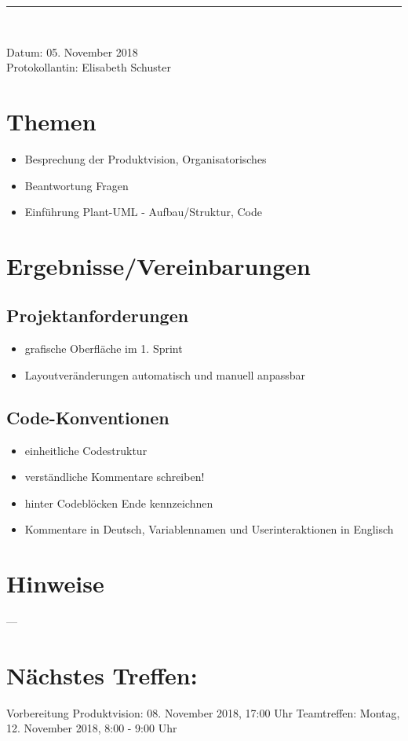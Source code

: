 \begin{center}  
\vspace{0.5pt}\nointerlineskip\rule{\textwidth}{0.2pt}\\ 
\vspace{0.5pt}\nointerlineskip
\end{center} 
\large Datum: 05. November 2018\vspace{3pt}\\\large Protokollantin: Elisabeth Schuster
\section{Themen}
\begin{itemize}
\item Besprechung der Produktvision, Organisatorisches
\item Beantwortung Fragen
\item Einführung Plant-UML - Aufbau/Struktur, Code
\end{itemize}
\section{Ergebnisse/Vereinbarungen}
\subsection*{Projektanforderungen}
\begin{itemize}
\item grafische Oberfläche im 1. Sprint
\item Layoutveränderungen automatisch und manuell anpassbar
\end{itemize}
\subsection*{Code-Konventionen}
\begin{itemize}
\item einheitliche Codestruktur
\item verständliche Kommentare schreiben!
\item hinter Codeblöcken Ende kennzeichnen
\item Kommentare in Deutsch, Variablennamen und Userinteraktionen in Englisch
\end{itemize}
\section{Hinweise}
---
\section*{Nächstes Treffen:}
Vorbereitung Produktvision: 08. November 2018, 17:00 Uhr
Teamtreffen: Montag, 12. November 2018, 8:00 - 9:00 Uhr
